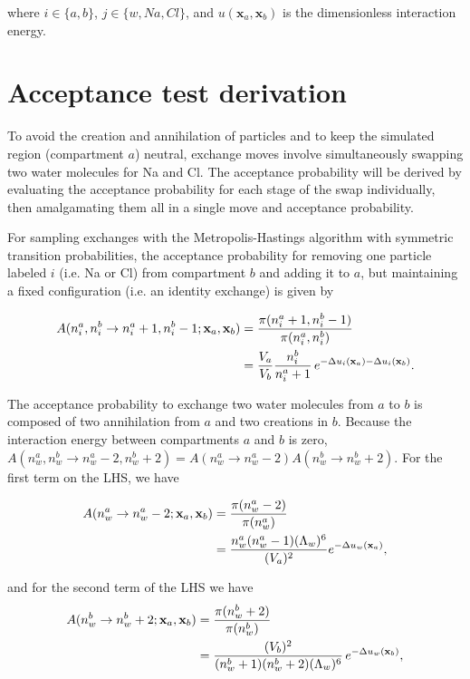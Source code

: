 \documentclass[11pt]{article} %
\begin{document}
where $i \in \{a,b\}$, $j \in \{w, Na, Cl\}$, and $u(\mathbf{x}_a,\mathbf{x}_b)$ is the dimensionless interaction energy.

\section{Acceptance test derivation}
To avoid the creation and annihilation of particles and to keep the simulated region (compartment $a$) neutral, exchange moves involve simultaneously swapping two water molecules for Na and Cl. The acceptance probability will be derived by evaluating the acceptance probability for each stage of the swap individually, then amalgamating them all in a single move and acceptance probability. 

For sampling exchanges with the Metropolis-Hastings algorithm with symmetric transition probabilities, the acceptance probability for removing one particle labeled $i$ (i.e. Na or Cl) from compartment $b$ and adding it to $a$, but maintaining a fixed configuration (i.e. an identity exchange) is given by

\begin{align}
A(n_i^a,n_i^b \rightarrow n_i^a + 1, n_i^b-1;\mathbf{x}_a,\mathbf{x}_b) &= \frac{\pi(n_i^a + 1, n_i^b-1)}{\pi(n_i^a,n_i^b)} \notag\\
&= \frac{V_a}{V_b} \frac{n^b_i}{n^a_i + 1} \, e^{-\Delta u_i(\mathbf{x}_a) - \Delta u_i(\mathbf{x}_b)}.
\end{align}

The acceptance probability to exchange two water molecules from $a$ to $b$ is composed of two annihilation from $a$ and two creations in $b$. Because the interaction energy between compartments $a$ and $b$ is zero, $A(n_w^a,n_w^b \rightarrow n_w^a - 2,n_w^b + 2) = A(n_w^a \rightarrow n_w^a - 2)A(n_w^b \rightarrow n_w^b + 2)$. For the first term on the LHS, we have

\begin{align}
A(n_w^a \rightarrow n_w^a - 2;\mathbf{x}_a,\mathbf{x}_b) & = \frac{\pi(n_w^a - 2)}{\pi(n_w^a)} \notag\\
&= \frac{n_w^a(n_w^a - 1)(\Lambda_w)^6 }{(V_a)^2} e^{-\Delta u_w(\mathbf{x}_a)},
\end{align}

and for the second term of the LHS we have
\begin{align}
A(n_w^b \rightarrow n_w^b + 2;\mathbf{x}_a,\mathbf{x}_b) &= \frac{\pi(n_w^b + 2)}{\pi(n_w^b)} \notag\\
&= \frac{(V_b)^2}{(n_w^b +1)(n_w^b +2)(\Lambda_w)^6} \, e^{-\Delta u_w(\mathbf{x}_b)},
\end{align}
\end{document}
